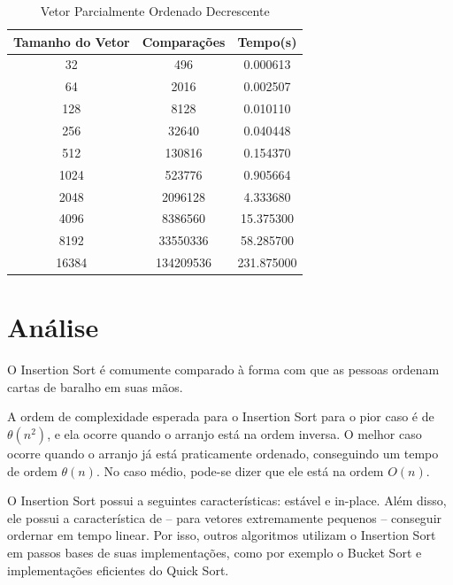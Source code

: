 \documentclass[12pt,a4paper,twoside]{report}
\begin{document}
\begin{table}[h]
  \centering
  \caption{Vetor Parcialmente Ordenado Decrescente \label{tab:pod}}
  \begin{tabular}{ccc} \\\hline
  \textbf{Tamanho do Vetor} & \textbf{Comparações} & \textbf{Tempo(s)} \\\hline
  32                        & 496                  & 0.000613          \\\hline
  64                        & 2016                 & 0.002507          \\\hline
  128                       & 8128                 & 0.010110          \\\hline
  256                       & 32640                & 0.040448          \\\hline
  512                       & 130816               & 0.154370          \\\hline
  1024                      & 523776               & 0.905664          \\\hline
  2048                      & 2096128              & 4.333680          \\\hline
  4096                      & 8386560              & 15.375300         \\\hline
  8192                      & 33550336             & 58.285700        \\\hline
  16384                     & 134209536            & 231.875000        \\\hline
  \end{tabular}
\end{table}


\chapter{Análise}

O Insertion Sort é comumente comparado à forma com que as pessoas ordenam cartas de baralho em suas mãos.

A ordem de complexidade esperada para o Insertion Sort para o pior caso é de $\theta (n^2)$, e ela ocorre quando o arranjo está na ordem inversa. O melhor caso ocorre quando o arranjo já está praticamente ordenado, conseguindo um tempo de ordem $\theta (n)$. No caso médio, pode-se dizer que ele está na ordem $O(n)$.

O Insertion Sort possui a seguintes características: estável e in-place. Além disso, ele possui a característica de – para vetores extremamente pequenos – conseguir ordernar em tempo linear. Por isso, outros algoritmos utilizam o Insertion Sort em passos bases de suas implementações, como por exemplo o Bucket Sort e implementações eficientes do Quick Sort.
\end{document}
